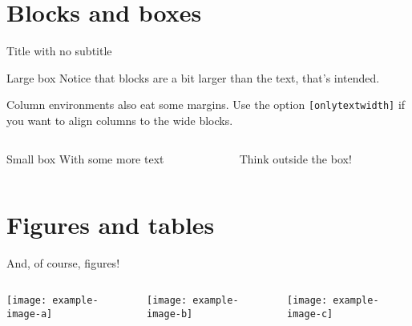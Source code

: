 \documentclass[11pt,aspectratio=169]{beamer}
\begin{document}
\section{Blocks and boxes}

\begin{frame}{Title with no subtitle}

	\begin{block}{Large box}
	Notice that blocks are a bit larger than the text, that's intended.
	\end{block}
	
	Column environments also eat some margins. Use the option \texttt{[onlytextwidth]} if you want to align columns to the wide blocks.
	
	\begin{columns}[onlytextwidth]
	\begin{column}{0.45\textwidth}
		\begin{block}{Small box}
		With some more text
		\end{block}
	\end{column}
	\begin{column}{0.5\textwidth}
		Think outside the box!
	\end{column}
	\end{columns}

\end{frame}

\section{Figures and tables}

\begin{frame}{And, of course, figures!}

	\begin{columns}
		\begin{column}{0.33\textwidth}
			\texttt{[image: example-image-a]}
		\end{column}
		\begin{column}{0.33\textwidth}
			\texttt{[image: example-image-b]}
		\end{column}
		\begin{column}{0.33\textwidth}
			\texttt{[image: example-image-c]}
		\end{column}
	\end{columns}

\end{frame}
\end{document}
